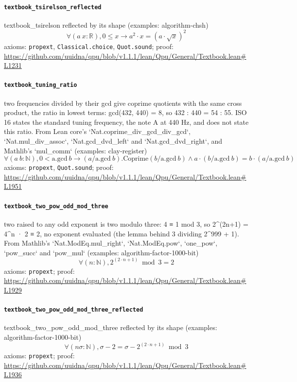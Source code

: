 \documentclass[11pt]{article}
\begin{document}
\paragraph{\texttt{textbook\_tsirelson\_reflected}}
textbook\_tsirelson reflected by its shape (examples: algorithm-chsh)
\[ \forall (a\ x : \mathbb{R}), 0 \le x \to a ^{2} \cdot x = (a \cdot \surd x) ^{2} \]
\noindent axioms: \texttt{propext}, \texttt{Classical.choice}, \texttt{Quot.sound}; proof: \url{https://github.com/uuidna/qpu/blob/v1.1.1/lean/Qpu/General/Textbook.lean\#L1231}

\paragraph{\texttt{textbook\_tuning\_ratio}}
two frequencies divided by their gcd give coprime quotients with the same cross product, the ratio in lowest terms: gcd(432, 440) = 8, so 432 : 440 = 54 : 55. ISO 16 states the standard tuning frequency, the note A at 440 Hz, and does not state this ratio. From Lean core's `Nat.coprime\_div\_gcd\_div\_gcd`, `Nat.mul\_div\_assoc`, `Nat.gcd\_dvd\_left` and `Nat.gcd\_dvd\_right`, and Mathlib's `mul\_comm` (examples: clay-register)
\[ \forall (a\ b : \mathbb{N}), 0 < \mathrm{a.gcd}\ b \to (a / \mathrm{a.gcd}\ b)\mathrm{.Coprime} (b / \mathrm{a.gcd}\ b) \land a \cdot (b / \mathrm{a.gcd}\ b) = b \cdot (a / \mathrm{a.gcd}\ b) \]
\noindent axioms: \texttt{propext}, \texttt{Quot.sound}; proof: \url{https://github.com/uuidna/qpu/blob/v1.1.1/lean/Qpu/General/Textbook.lean\#L1951}

\paragraph{\texttt{textbook\_two\_pow\_odd\_mod\_three}}
two raised to any odd exponent is two modulo three: 4 ≡ 1 mod 3, so 2\^{}(2n+1) = 4\^{}n · 2 ≡ 2, no exponent evaluated (the lemma behind 3 dividing 2\^{}999 + 1). From Mathlib's `Nat.ModEq.mul\_right`, `Nat.ModEq.pow`, `one\_pow`, `pow\_succ` and `pow\_mul` (examples: algorithm-factor-1000-bit)
\[ \forall (n : \mathbb{N}), 2 ^{(2 \cdot n + 1)} \bmod 3 = 2 \]
\noindent axioms: \texttt{propext}; proof: \url{https://github.com/uuidna/qpu/blob/v1.1.1/lean/Qpu/General/Textbook.lean\#L1929}

\paragraph{\texttt{textbook\_two\_pow\_odd\_mod\_three\_reflected}}
textbook\_two\_pow\_odd\_mod\_three reflected by its shape (examples: algorithm-factor-1000-bit)
\[ \forall (n \sigma : \mathbb{N}), \sigma - 2 = \sigma - 2 ^{(2 \cdot n + 1)} \bmod 3 \]
\noindent axioms: \texttt{propext}; proof: \url{https://github.com/uuidna/qpu/blob/v1.1.1/lean/Qpu/General/Textbook.lean\#L1936}
\end{document}

